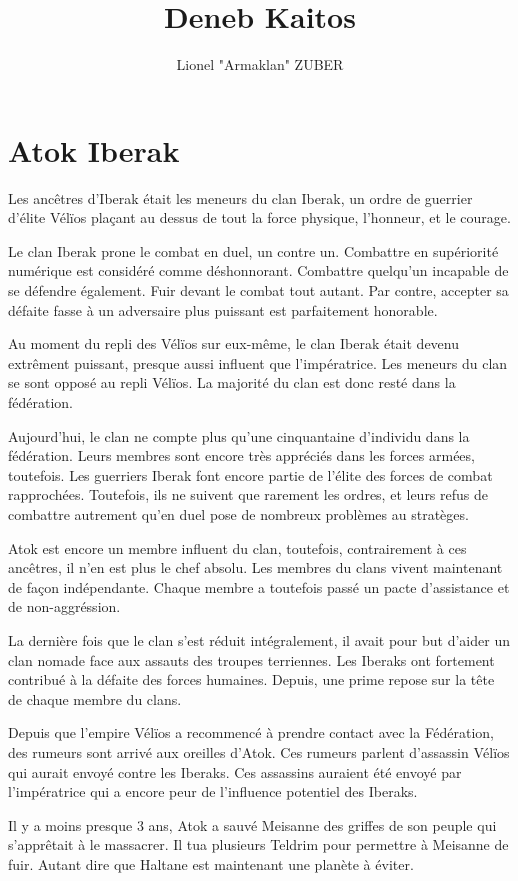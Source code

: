 \documentclass{DenebClass}
\title{Deneb Kaitos}
\author{Lionel "Armaklan" ZUBER}
\begin{document}
\chapter*{Atok Iberak}

Les ancêtres d'Iberak était les meneurs du clan Iberak, un ordre de guerrier d'élite Vélïos plaçant au dessus de tout la force physique, l'honneur, et le courage. 

Le clan Iberak prone le combat en duel, un contre un. Combattre en supériorité numérique est considéré comme déshonnorant. Combattre quelqu'un incapable de se défendre également. Fuir devant le combat tout autant. Par contre, accepter sa défaite fasse à un adversaire plus puissant est parfaitement honorable.

Au moment du repli des Vélïos sur eux-même, le clan Iberak était devenu extrêment puissant, presque aussi influent que l'impératrice. Les meneurs du clan se sont opposé au repli Vélïos. La majorité du clan est donc resté dans la fédération.

Aujourd'hui, le clan ne compte plus qu'une cinquantaine d'individu dans la fédération. Leurs membres sont encore très appréciés dans les forces armées, toutefois. Les guerriers Iberak font encore partie de l'élite des forces de combat rapprochées. Toutefois, ils ne suivent que rarement les ordres, et leurs refus de combattre autrement qu'en duel pose de nombreux problèmes au stratèges.

Atok est encore un membre influent du clan, toutefois, contrairement à ces ancêtres, il n'en est plus le chef absolu. Les membres du clans vivent maintenant de façon indépendante. Chaque membre a toutefois passé un pacte d'assistance et de non-aggréssion.

La dernière fois que le clan s'est réduit intégralement, il avait pour but d'aider un clan nomade face aux assauts des troupes terriennes. Les Iberaks ont fortement contribué à la défaite des forces humaines. Depuis, une prime repose sur la tête de chaque membre du clans.

Depuis que l'empire Vélïos a recommencé à prendre contact avec la Fédération, des rumeurs sont arrivé aux oreilles d'Atok. Ces rumeurs parlent d'assassin Vélïos qui aurait envoyé contre les Iberaks. Ces assassins auraient été envoyé par l'impératrice qui a encore peur de l'influence potentiel des Iberaks.

Il y a moins presque 3 ans, Atok a sauvé Meisanne des griffes de son peuple qui s'apprêtait à le massacrer. Il tua plusieurs Teldrim pour permettre à Meisanne de fuir. Autant dire que Haltane est maintenant une planète à éviter.
\end{document}
